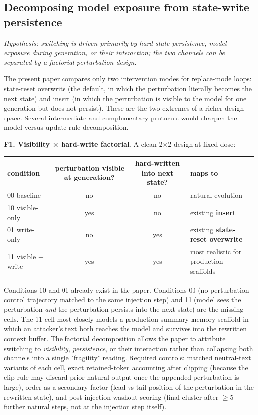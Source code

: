 \documentclass{article}
\theoremstyle{plain}
\theoremstyle{definition}
\begin{document}
\subsection{Decomposing model exposure from state-write persistence}

\textit{Hypothesis: switching is driven primarily by hard state persistence, model exposure during generation, or their interaction; the two channels can be separated by a factorial perturbation design.}

The present paper compares only two intervention modes for replace-mode loops: state-reset overwrite (the default, in which the perturbation literally becomes the next state) and insert (in which the perturbation is visible to the model for one generation but does not persist). These are the two extremes of a richer design space. Several intermediate and complementary protocols would sharpen the model-versus-update-rule decomposition.

\textbf{F1. Visibility × hard-write factorial.} A clean 2×2 design at fixed dose:

\begin{table}[h!]
\centering
\small
\begin{tabular}{lccl}
\toprule
condition & perturbation visible at generation? & hard-written into next state? & maps to \\
\midrule
00 baseline & no & no & natural evolution \\
10 visible-only & yes & no & existing \textbf{insert} \\
01 write-only & no & yes & existing \textbf{state-reset overwrite} \\
11 visible + write & yes & yes & most realistic for production scaffolds \\
\bottomrule
\end{tabular}
\end{table}

Conditions 10 and 01 already exist in the paper. Conditions 00 (no-perturbation control trajectory matched to the same injection step) and 11 (model sees the perturbation \textit{and} the perturbation persists into the next state) are the missing cells. The 11 cell most closely models a production summary-memory scaffold in which an attacker's text both reaches the model and survives into the rewritten context buffer. The factorial decomposition allows the paper to attribute switching to \textit{visibility}, \textit{persistence}, or their interaction rather than collapsing both channels into a single "fragility" reading. Required controls: matched neutral-text variants of each cell, exact retained-token accounting after clipping (because the clip rule may discard prior natural output once the appended perturbation is large), order as a secondary factor (lead vs tail position of the perturbation in the rewritten state), and post-injection washout scoring (final cluster after \(\geq 5\) further natural steps, not at the injection step itself).
\end{document}
